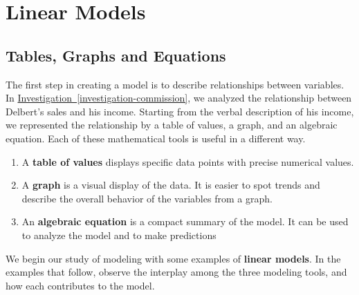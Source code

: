 \documentclass[10pt,]{book}
\newcommand{\terminology}[1]{\textbf{#1}}
\theoremstyle{plain}
\theoremstyle{definition}
\theoremstyle{definition}
\theoremstyle{definition}
\theoremstyle{definition}
\numberwithin{equation}{part}
\begin{document}
\section[{Linear Models}]{Linear Models}\label{LinMod}
\typeout{************************************************}
\typeout{************************************************}
\subsection[{Tables, Graphs and Equations}]{Tables, Graphs and Equations}\label{subsection-1}
The first step in creating a model is to describe relationships between variables.  In \hyperref[investigation-commission]{Investigation~\ref{investigation-commission}}, we analyzed the relationship between Delbert's sales and his income.  Starting from the verbal description of his income, we represented the relationship by a table of values, a graph, and an algebraic equation.  Each of these mathematical tools is useful in a different way.%
\leavevmode%
\begin{enumerate}
\item\hypertarget{li-10}{}A \terminology{table of values} displays specific data points with precise numerical values.%
\item\hypertarget{li-11}{}A \terminology{graph} is a visual display of the data.  It is easier to spot trends and describe the overall behavior of the variables from a graph.%
\item\hypertarget{li-12}{}An \terminology{algebraic equation} is a compact summary of the model.  It can be used to analyze the model and to make predictions%
\end{enumerate}
We begin our study of modeling with some examples of \terminology{linear models}.  In the examples that follow, observe the interplay among the three modeling tools, and how each contributes to the model.%
\end{document}
